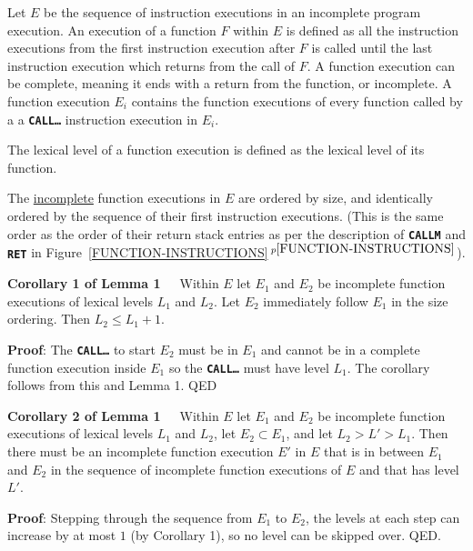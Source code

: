 \documentclass[12pt]{article}
\newcommand{\TT}[1]{{\tt \bfseries #1}}
\newcommand{\itemref}[1]{\ref{#1}$\,^{p\pageref{#1}}$}
\newenvironment{indpar}[1][0.3in]%
	{\begin{list}{}%
		     {\setlength{\itemsep}{0in}%
		      \setlength{\topsep}{0in}%
		      \setlength{\parsep}{1ex}%
		      \setlength{\labelwidth}{#1}%
		      \setlength{\leftmargin}{#1}%
		      \addtolength{\leftmargin}{\labelsep}}%
	 \item}%
	{\end{list}}
\begin{document}
Let $E$ be the sequence of instruction executions in an
incomplete program execution.
An execution of a function $F$ within $E$ is defined as all the
instruction executions from the first instruction execution
after $F$ is called until the last instruction execution which returns
from the call of $F$.  A function execution can be complete, meaning
it ends with a return from the function, or incomplete.  A function execution
$E_i$ contains the function executions of every function called by a 
a \TT{CALL\ldots} instruction execution in $E_i$.

The lexical level of a function execution is defined as the lexical level
of its function.

The \underline{incomplete} function executions in $E$ are ordered by size, and
identically ordered by the sequence of their first instruction executions.
(This is the same order as the order of their return stack entries
as per the description of \TT{CALLM} and \TT{RET} in
Figure~\itemref{FUNCTION-INSTRUCTIONS}).

\begin{indpar}
{\bf Corollary 1 of Lemma 1}~~~Within $E$
let $E_1$ and $E_2$ be incomplete function
executions of lexical levels
$L_1$ and $L_2$.  Let $E_2$ immediately follow $E_1$ in the size
ordering.  Then $L_2\leq L_1+1$.
\end{indpar}
\begin{indpar}
{\bf Proof}: The \TT{CALL\ldots} to start $E_2$ must be in $E_1$
and cannot be in a complete function execution inside $E_1$ so
the \TT{CALL\ldots} must have level $L_1$.  The corollary follows
from this and Lemma 1. QED
\end{indpar}

\begin{indpar}
{\bf Corollary 2 of Lemma 1}~~~Within $E$
let $E_1$ and $E_2$ be incomplete function
executions of lexical levels
$L_1$ and $L_2$, let $E_2\subset E_1$, and let $L_2>L'>L_1$.
Then there must be an incomplete function execution $E'$ in $E$
that is in between $E_1$ and $E_2$ in the sequence of incomplete function
executions of $E$ and that has level $L'$.
\end{indpar}
\begin{indpar}
{\bf Proof}: Stepping through the sequence from $E_1$ to $E_2$,
the levels at each step can increase by at most $1$ (by Corollary 1),
so no level can be skipped over.  QED.
\end{indpar}
\end{document}
